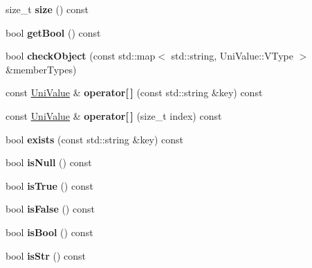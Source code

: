 \begin{DoxyCompactItemize}
size\+\_\+t {\bfseries size} () const
\item 
\mbox{\label{class_uni_value_acb5c848d20cb741dbe65e28bc513baa8}} 
bool {\bfseries get\+Bool} () const
\item 
\mbox{\label{class_uni_value_a2ec95a1ab26c60f471e2baef3ffa11ef}} 
bool {\bfseries check\+Object} (const std\+::map$<$ std\+::string, Uni\+Value\+::\+V\+Type $>$ \&member\+Types)
\item 
\mbox{\label{class_uni_value_a998b72bd7f758e01416e1b53eaa6d94c}} 
const \mbox{\hyperlink{class_uni_value}{Uni\+Value}} \& {\bfseries operator\mbox{[}$\,$\mbox{]}} (const std\+::string \&key) const
\item 
\mbox{\label{class_uni_value_ad3cf3ae4df01e178b856f830f619e52e}} 
const \mbox{\hyperlink{class_uni_value}{Uni\+Value}} \& {\bfseries operator\mbox{[}$\,$\mbox{]}} (size\+\_\+t index) const
\item 
\mbox{\label{class_uni_value_aad13d343dbda293251205e37d8b83c27}} 
bool {\bfseries exists} (const std\+::string \&key) const
\item 
\mbox{\label{class_uni_value_a3661be0f5580daceb23e5338e3a0df22}} 
bool {\bfseries is\+Null} () const
\item 
\mbox{\label{class_uni_value_a1491167609f899d0c7773749b5047969}} 
bool {\bfseries is\+True} () const
\item 
\mbox{\label{class_uni_value_ae79ab57378176379dd206c5e2d6f5feb}} 
bool {\bfseries is\+False} () const
\item 
\mbox{\label{class_uni_value_a97cbb7890d4a8c4b924ad5ffd7bc34c1}} 
bool {\bfseries is\+Bool} () const
\item 
\mbox{\label{class_uni_value_a8abe13a4663ccfda54ae2440ed445c5a}} 
bool {\bfseries is\+Str} () const
\item 
\mbox{\label{class_uni_value_ac5271a9bb4ece86f00052bb5603eaa78}} 

\end{DoxyCompactItemize}
